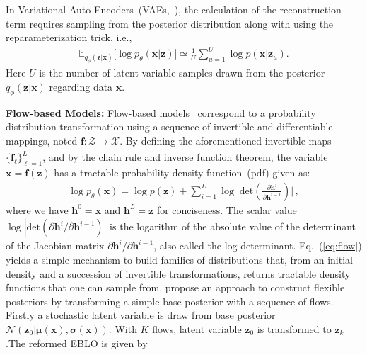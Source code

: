 \documentclass[sigconf, anonymous, review]{acmart}
\theoremstyle{plain}
\theoremstyle{definition}
\theoremstyle{remark}
\begin{document}
\noindent In Variational Auto-Encoders~(VAEs,~\cite{kingma2013auto,rezende2014stochastic}), the calculation of the reconstruction term requires sampling from the posterior distribution along with using the reparameterization trick, i.e.,
\begin{align} \label{eq:vae_recon}
\mathbb{E}_{q_{\phi}(\mathbf{z}|\mathbf{x})} \big[\log p_{\theta}(\mathbf{x}|\mathbf{z}) \big] \simeq \frac{1}{U}\sum_{u=1}^U \log p(\mathbf{x}| \mathbf{z}_{u}). \end{align} 
Here $U$ is the number of latent variable samples drawn from the posterior $q_{\phi}(\mathbf{z}|\mathbf{x})$ regarding data $\mathbf{x}$. 

\textbf{Flow-based Models:}
Flow-based models~\cite{Dinh2016DensityEU, dinh2014nice,rezende2015variational,berg2018sylvester} 
correspond to a probability distribution transformation using  a sequence of invertible and differentiable mappings, noted $\mathbf{f}: \mathcal{Z} \xrightarrow[]{} \mathcal{X}$. By defining the aforementioned invertible maps $\{\mathbf{f}_{\ell} \}_{\ell =1}^L$, and by the chain rule and inverse function theorem, the variable $\mathbf{x}=\mathbf{f}(\mathbf{z})$ has a tractable probability density function~(pdf) given as:
\begin{align}\label{eq:flow}
\log p_{\theta}(\mathbf{x}) =  \log p(\mathbf{z}) + \sum_{i=1}^L\log \bigg| \text{det} ( \frac{\partial \mathbf{h}^i } {\partial \mathbf{h}^{i-1}}) \bigg| \, ,
\end{align}
where we have $\mathbf{h}^0 = \mathbf{x}$ and $\mathbf{h}^L = \mathbf{z}$ for conciseness. 
The scalar value $\log |\text{det}( \partial \mathbf{h}^i/\partial \mathbf{h}^{i-1})|$ is the logarithm of the absolute value of the determinant of the Jacobian matrix $\partial \mathbf{h}^i/\partial \mathbf{h}^{i-1}$, also called the log-determinant. 
Eq.~(\ref{eq:flow}) yields a simple mechanism to build families of distributions that, from an initial density and a succession of invertible transformations, returns tractable density functions that one can sample from. \cite{rezende2015variational} propose an approach to construct flexible posteriors by transforming  a simple base posterior with a sequence of flows. Firstly a stochastic latent variable is draw from base posterior $\mathcal{N}(\mathbf{z}_0|\mathbf{\mu}(\mathbf{x}), \mathbf{\sigma}(\mathbf{x}) )$. With $K$ flows, latent variable $\mathbf{z}_0$ is transformed to $\mathbf{z}_k$.The reformed  EBLO is given by 
\end{document}

